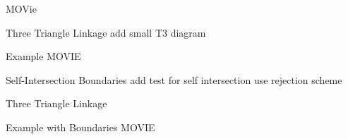 \documentclass{beamer}
\begin{document}
\begin{frame}{}
MOVie
\end{frame}
\begin{frame}{Three Triangle Linkage}
add small T3 diagram
  \centering
\end{frame}
\begin{frame}{Example}
MOVIE
\end{frame}
\begin{frame}{Self-Intersection Boundaries}
add test for self intersection 
use rejection scheme
\end{frame}
\begin{frame}{Three Triangle Linkage}
  \centering
\end{frame}
\begin{frame}{Example with Boundaries}
MOVIE
\end{frame}
\end{document}
